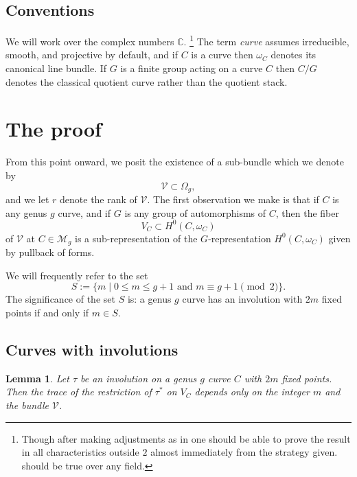 \documentclass[reqno]{amsart}
\theoremstyle{plain}
\newtheorem{lemma}[theorem]{Lemma}
\newcommand{\V}{\mathscr{V}}
\newcommand{\M}{\mathscr{M}}
\newcommand{\Hodge}{\Omega}
\newcommand{\C}{\mathbb{C}}
\begin{document}
\subsection{Conventions} We will work over the complex numbers $\C$. \footnote{Though after
making adjustments as in   one
should be able to prove the result in all characteristics outside $2$ almost
immediately from the strategy given.  should be true over any field.} The term \textit{curve} assumes 
irreducible, smooth, and projective by default, and if $C$ is a curve then
$\omega_{C}$ denotes its canonical line bundle.  If $G$ is a finite group acting
on a curve $C$ then $C/G$ denotes the classical quotient curve rather than the
quotient stack.  




\section{The proof} 

From this point onward, we posit the existence of a sub-bundle which we denote by \[\V
\subset \Hodge_{g},\] and we let $r$ denote the rank of $\V$.  The first
observation we make is that if $C$ is any genus $g$ curve, and if $G$ is any group of
automorphisms of $C$, then the fiber \[V_{C} \subset H^{0}(C,\omega_{C})\] of $\V$ at $C \in \M_{g}$ is a
sub-representation of the $G$-representation $H^{0}(C,\omega_{C})$ given by
pullback of forms.


We will frequently refer to the set \[S := \{m \mid 0 \leq m \leq
g+1\,\,\textrm{and} \,\, m \equiv g+1 \pmod 2 \}.\]
The significance of the set $S$ is: a genus $g$ curve has an involution with
$2m$
fixed points if and only if $m \in S$.  

\subsection{Curves with involutions}

\begin{lemma}
  \label{corollary:independent} Let $\tau$ be an involution on a genus $g$ curve
  $C$ with $2m$ fixed points.  Then the trace
  of the restriction of $\tau^{*}$ on $V_{C}$ depends only on the integer $m$ and the bundle
  $\V$. 
\end{lemma}
\end{document}
